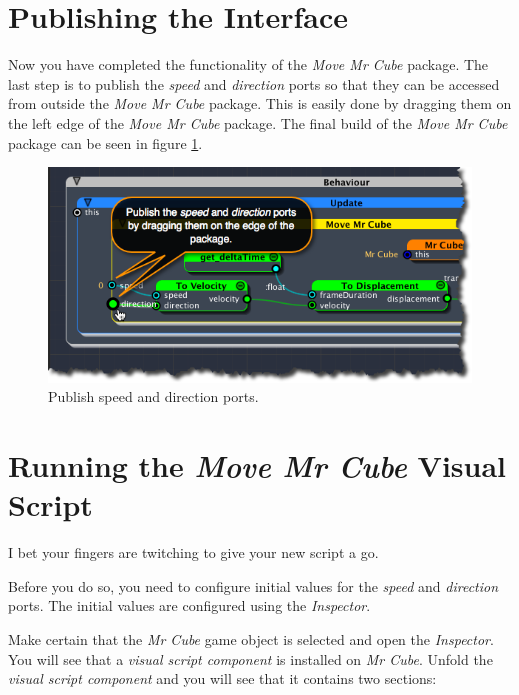 \section{Publishing the Interface}
\label{publishingtheinterface}

Now you have completed the functionality of the \emph{Move Mr Cube} package. The last step is to publish the \emph{speed} and \emph{direction} ports so that they can be accessed from outside the \emph{Move Mr Cube} package. This is easily done by dragging them on the left edge of the \emph{Move Mr Cube} package. The final build of the \emph{Move Mr Cube} package can be seen in figure \ref{publish-speed-and-direction.png}.

\begin{figure}[htbp]
\centering
\includegraphics[keepaspectratio,width=\textwidth,height=0.75\textheight]{publish-speed-and-direction.png}
\caption{Publish speed and direction ports.}
\label{publish-speed-and-direction.png}
\end{figure}

\section{Running the \emph{Move Mr Cube} Visual Script}
\label{runningthemovemrcubevisualscript}

I bet your fingers are twitching to give your new script a go.

Before you do so, you need to configure initial values for the \emph{speed} and \emph{direction} ports. The initial values are configured using the \emph{Inspector}.

Make certain that the \emph{Mr Cube} game object is selected and open the \emph{Inspector}. You will see that a \emph{visual script component} is installed on \emph{Mr Cube}. Unfold the \emph{visual script component} and you will see that it contains two sections:

